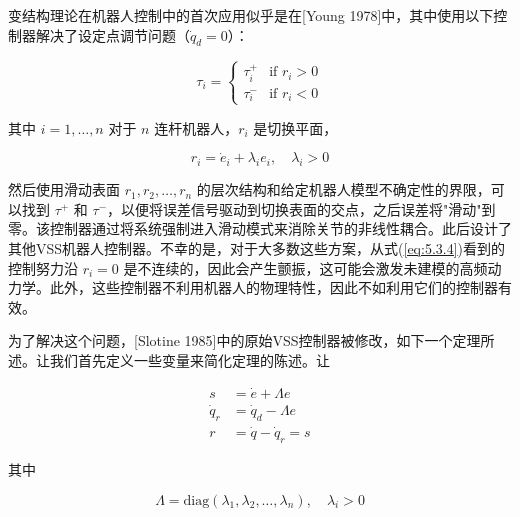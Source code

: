 \documentclass[UTF8,12pt,a4paper]{ctexart}
\begin{document}
变结构理论在机器人控制中的首次应用似乎是在[Young 1978]中，其中使用以下控制器解决了设定点调节问题（$\dot{q}_d = 0$）：

\begin{equation}\label{eq:5.3.4}
\tau_i = \begin{cases}
\tau_i^+ & \text{if } r_i > 0 \\
\tau_i^- & \text{if } r_i < 0
\end{cases}
\end{equation}

其中 $i = 1, \ldots, n$ 对于 $n$ 连杆机器人，$r_i$ 是切换平面，

\begin{equation}\label{eq:5.3.5}
r_i = \dot{e}_i + \lambda_i e_i, \quad \lambda_i > 0
\end{equation}

然后使用滑动表面 $r_1, r_2, \ldots, r_n$ 的层次结构和给定机器人模型不确定性的界限，可以找到 $\tau^+$ 和 $\tau^-$，以便将误差信号驱动到切换表面的交点，之后误差将"滑动"到零。该控制器通过将系统强制进入滑动模式来消除关节的非线性耦合。此后设计了其他VSS机器人控制器。不幸的是，对于大多数这些方案，从式(\ref{eq:5.3.4})看到的控制努力沿 $r_i = 0$ 是不连续的，因此会产生颤振，这可能会激发未建模的高频动力学。此外，这些控制器不利用机器人的物理特性，因此不如利用它们的控制器有效。

为了解决这个问题，[Slotine 1985]中的原始VSS控制器被修改，如下一个定理所述。让我们首先定义一些变量来简化定理的陈述。让

\begin{equation}\label{eq:5.3.6}
\begin{aligned}
s &= \dot{e} + \Lambda e \\
\dot{q}_r &= \dot{q}_d - \Lambda e \\
r &= \dot{q} - \dot{q}_r = s
\end{aligned}
\end{equation}

其中

\begin{equation}
\Lambda = \text{diag}(\lambda_1, \lambda_2, \ldots, \lambda_n), \quad \lambda_i > 0
\end{equation}
\end{document}

